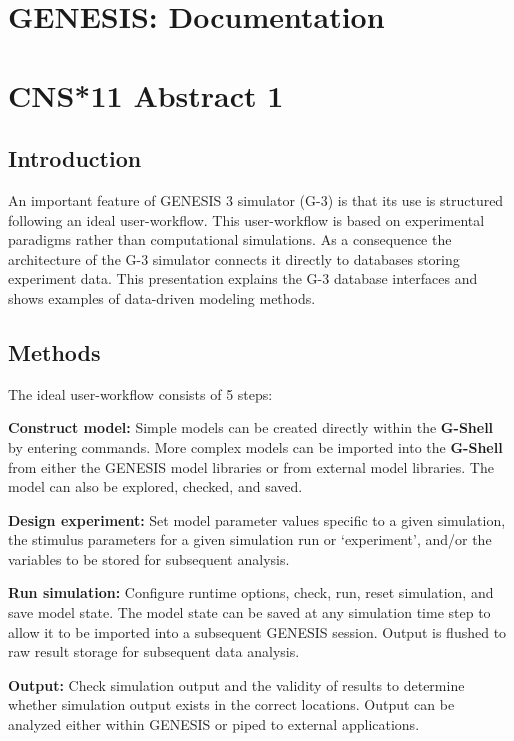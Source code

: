 \documentclass[12pt]{article}
\begin{document}
\section*{GENESIS: Documentation}

\section*{CNS*11 Abstract 1}

\subsection*{Introduction}

An important feature of GENESIS 3 simulator (G-3) is that its use is
structured following an ideal user-workflow.  This user-workflow is
based on experimental paradigms rather than computational simulations.
As a consequence the architecture of the G-3 simulator connects it
directly to databases storing experiment data.  This presentation
explains the G-3 database interfaces and shows examples of data-driven
modeling methods.


\subsection*{Methods}

The ideal user-workflow consists of 5 steps:

{\bf Construct model:} Simple models can be created directly within
the {\bf G-Shell} by entering commands. More complex models can be
imported into the {\bf G-Shell} from either the GENESIS model
libraries or from external model libraries. The model can also be
explored, checked, and saved.

{\bf Design experiment:} Set model parameter values specific to a
given simulation, the stimulus parameters for a given simulation run
or `experiment', and/or the variables to be stored for subsequent
analysis.

{\bf Run simulation:} Configure runtime options, check, run, reset
simulation, and save model state. The model state can be saved at any
simulation time step to allow it to be imported into a subsequent
GENESIS session. Output is flushed to raw result storage for
subsequent data analysis.

{\bf Output:} Check simulation output and the validity of results to
determine whether simulation output exists in the correct locations.
Output can be analyzed either within GENESIS or piped to external
applications.
\end{document}
